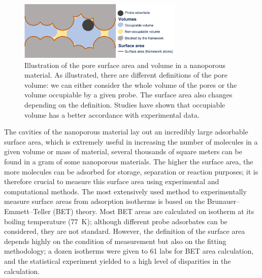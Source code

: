 \documentclass[main.tex]{subfiles}
\begin{document}
\begin{figure}[ht]
  \centering
  \includegraphics[width=0.7\textwidth]{figures/1-screening/Pore_descriptors.jpg}
  \caption{Illustration of the pore surface area and volume in a nanoporous material. As illustrated, there are different definitions of the pore volume: we can either consider the whole volume of the pores or the volume occupiable by a given probe. The surface area also changes depending on the definition. Studies have shown that occupiable volume has a better accordance with experimental data.\cite{vol_Ongari2017}}\label{fgr:pores}
\end{figure}

The cavities of the nanoporous material lay out an incredibly large adsorbable surface area, which is extremely useful in increasing the number of molecules in a given volume or mass of material, several thousands of square meters can be found in a gram of some nanoporous materials.\cite{Farha_2012} The higher the surface area, the more molecules can be adsorbed for storage, separation or reaction purposes; it is therefore crucial to measure this surface area using experimental and computational methods. The most extensively used method to experimentally measure surface areas from adsorption isotherms is based on the Brunauer–Emmett–Teller (BET) theory.\cite{Detsi_2011} Most BET areas are calculated on  isotherm at its boiling temperature (\SI{77}{\kelvin}); although different probe adsorbates can be considered, they are not standard.\cite{Tian_2017} However, the definition of the surface area depends highly on the condition of measurement but also on the fitting methodology; a dozen isotherms were given to 61 labs for BET area calculation, and the statistical experiment yielded to a high level of disparities in the calculation.\cite{Osterrieth_2022} 
\end{document}

